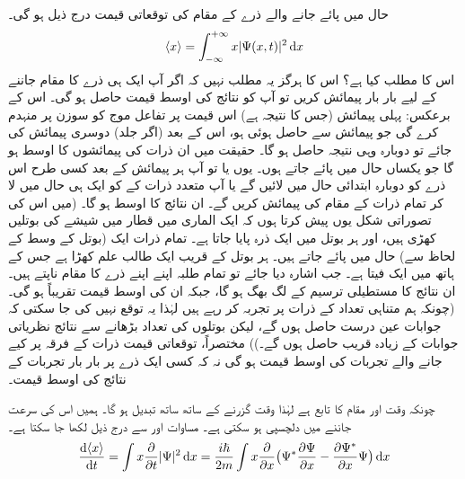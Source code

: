  حال  میں پائے جانے والے ذرے کے مقام  کی توقعاتی قیمت درج ذیل ہو گی۔
\begin{align}\label{مساوات_تفاعل_موج_معیار_حرکت_توقعاتی_قیمت_تعریف}
\langle x\rangle=\int_{-\infty}^{+\infty}x|\Psi (x,t)|^{2}\dif{x}
\end{align}
اس کا مطلب کیا ہے؟ اس کا ہرگز یہ مطلب نہیں  کہ اگر آپ ایک ہی ذرے کا مقام جاننے کے لیے بار بار پیمائش کریں تو آپ کو نتائج کی اوسط قیمت   حاصل ہو گی۔ اس کے برعکس: پہلی پیمائش (جس کا نتیجہ  ہے) اس قیمت پر تفاعل موج کو سوزن پر منہدم کرے گی جو پیمائش سے حاصل ہوئی ہو، اس کے بعد (اگر جلد) دوسری پیمائش کی جائے تو دوبارہ وہی نتیجہ حاصل ہو گا۔ حقیقت میں  ان ذرات کی  پیمائشوں کا  اوسط ہو گا جو یکساں حال  میں پائے جاتے ہوں۔ یوں یا تو آپ ہر پیمائش کے بعد کسی طرح اس ذرے کو دوبارہ ابتدائی حال  میں لائیں گے یا آپ متعدد ذرات کے  کو ایک ہی حال  میں لا کر تمام  ذرات کے مقام کی پیمائش کریں گے۔ ان نتائج کا اوسط  ہو گا۔ (میں اس کی تصوراتی شکل یوں پیش کرتا ہوں کہ ایک الماری میں قطار میں شیشے  کی بوتلیں کھڑی ہیں، اور ہر بوتل میں ایک ذرہ پایا جاتا ہے۔ تمام ذرات ایک (بوتل کے وسط کے لحاظ سے)  حال  میں پائے جاتے ہیں۔ ہر بوتل کے قریب ایک طالب علم کھڑا ہے جس کے ہاتھ میں ایک فیتا ہے۔ جب اشارہ دیا جائے تو تمام طلبہ اپنے اپنے ذرے کا مقام ناپتے ہیں۔ ان نتائج کا مستطیلی ترسیم  کے لگ بھگ ہو گا، جبکہ ان کی اوسط قیمت تقریباً  ہو گی۔ (چونکہ ہم متناہی تعداد کے ذرات پر تجربہ کر رہے ہیں لہٰذا یہ توقع نہیں کی جا سکتی کہ جوابات عین درست حاصل ہوں گے، لیکن بوتلوں کی تعداد بڑھانے سے نتائج نظریاتی جوابات کے زیادہ قریب حاصل ہوں گے۔)) مختصراً، توقعاتی قیمت ذرات کے فرقہ پر کیے جانے والے تجربات کی اوسط قیمت ہو گی نہ کہ کسی ایک ذرے پر بار بار تجربات کے  نتائج کی اوسط قیمت۔

 چونکہ  وقت اور مقام کا تابع ہے لہٰذا وقت گزرنے کے ساتھ ساتھ   تبدیل ہو گا۔ ہمیں اس کی  سرعت جاننے میں دلچسپی ہو سکتی ہے۔ مساوات  اور  سے درج ذیل لکھا جا سکتا ہے۔
\begin{align}\label{مساوات_تفاعل_موج_رفتار_توقعاتی_الف}
\frac{\dif \,\langle x \rangle}{\dif{t}}=\int x\frac{\partial}{\partial{t}}|\Psi|^{2}\dif{x}=\frac{i\hslash}{2m}\int x\frac{\partial}{\partial{x}}\big (\Psi ^*\frac{\partial{\Psi}}{\partial{x}}-\frac{\partial{\Psi^*}}{\partial{x}}\Psi \big)\dif{x}
\end{align}

